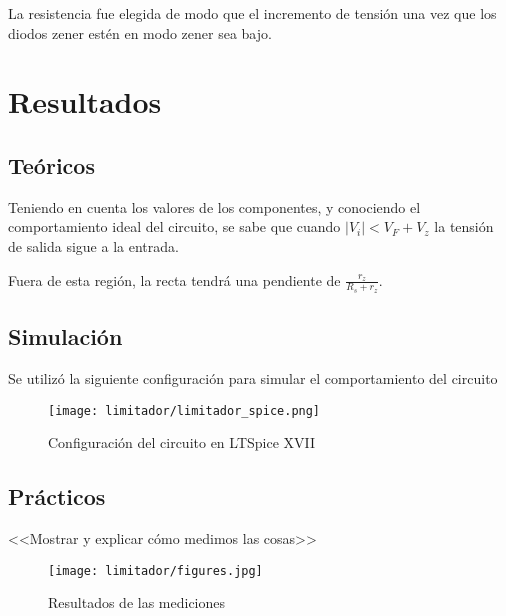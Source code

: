 La resistencia fue elegida de modo que el incremento de tensión una vez que los diodos zener estén en modo zener sea bajo.

\section{Resultados}

\subsection{Teóricos}
Teniendo en cuenta los valores de los componentes, y conociendo el comportamiento ideal del circuito, se sabe que cuando $|V_i|< V_F+V_z$ la tensión de salida sigue a la entrada.

Fuera de esta región, la recta tendrá una pendiente de $\frac{r_z}{R_s+r_z}$.
\subsection{Simulación}
Se utilizó la siguiente configuración para simular el comportamiento del circuito

\begin{figure}[ht]
    \begin{center}
        \texttt{[image: limitador/limitador\_spice.png]}
        \caption{Configuración del circuito en LTSpice XVII}
    \end{center}
\end{figure}

\subsection{Prácticos}
<<Mostrar y explicar cómo medimos las cosas>>

\begin{figure}[ht]
    \begin{center}
        \texttt{[image: limitador/figures.jpg]}
        \caption{Resultados de las mediciones}
    \end{center}
\end{figure}